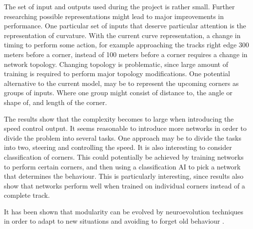 The set of input and outputs used during the project is rather small. Further researching possible representations might lead to major improvements in performance. One particular set of inputs that deserve particular attention is the representation of curvature. With the current curve representation, a change in timing to perform some action, for example approaching the tracks right edge 300 meters before a corner, instead of 100 meters before a corner requires a change in network topology. Changing topology is problematic, since large amount of training is required to perform major topology modifications. One potential alternative to the current model, may be to represent the upcoming corners as groups of inputs. Where one group might consist of distance to, the angle or shape of, and length of the corner.

The results show that the complexity becomes to large when introducing the speed control output. It seems reasonable to introduce more networks in order to divide the problem into several tasks. One approach may be to divide the tasks into two, steering and controlling the speed. It is also interesting to consider classification of corners. This could potentially be achieved by training networks to perform certain corners, and then using a classification AI to pick a network that determines the behaviour. This is particularly interesting, since results also show that networks perform well when trained on individual corners instead of a complete track.


It has been shown that modularity can be evolved by neuroevolution techniques in order to adapt to new situations and avoiding to forget old behaviour \cite{ellefs2015neural}.








